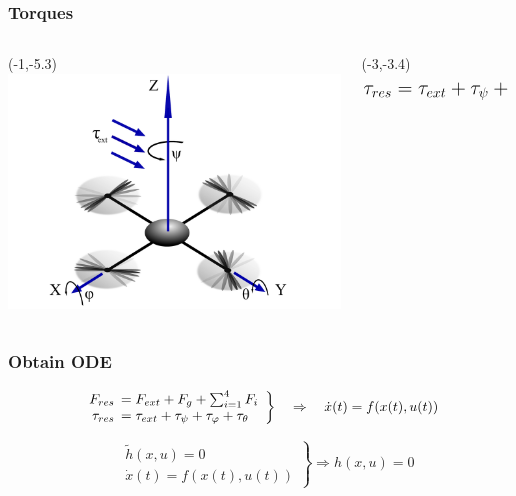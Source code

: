 \begin{frame}
		\frametitle{Torques}
			\begin{columns}[T] %
			\begin{column}{.7\textwidth}
				\begin{textblock}{0}(-1,-5.3)
					\includegraphics[width=11cm]{images/Copter_Text.pdf}
				\end{textblock}
			\end{column}
			\begin{column}{0.35\textwidth}
				\begin{textblock}{0}(-3,-3.4)
					\[ \mathlarger{\mathlarger{\tau_{res} = \tau_{ext}+\tau_{\psi}+\tau_{\varphi}+\tau_{\theta}}} \]
				\end{textblock}
				\end{column}
		\end{columns}
\end{frame}

\begin{frame}
	\frametitle{Obtain ODE}
	\begin{block}{}
		\centering
		\[\left. \begin{array}{rl} F_{res} \hspace{-1.25ex} &= F_{ext} + F_{g} + \sum_{i=1}^{4}{F_{i}} \\ \tau_{res} \hspace{-1.25ex} &= \tau_{ext} + \tau_{\psi} + \tau_{\varphi} + \tau_{\theta}  \end{array} \right\} \quad \Rightarrow \quad \dot{x}(t)=f(x(t),u(t)) \]
		\vspace{1ex}
	\end{block}
	
	\vspace{2em}
	
	
	\begin{block}{}
		\begin{center}
		 	\[ \quad \left. \begin{array}{c} \tilde{h}(x,u)=0 \\  \dot{x}(t) = f(x(t),u(t)) \end{array} \right\} \Rightarrow h(x,u) = 0	\]
		\end{center}
		\vspace{1ex}
	\end{block}
	
\end{frame}
